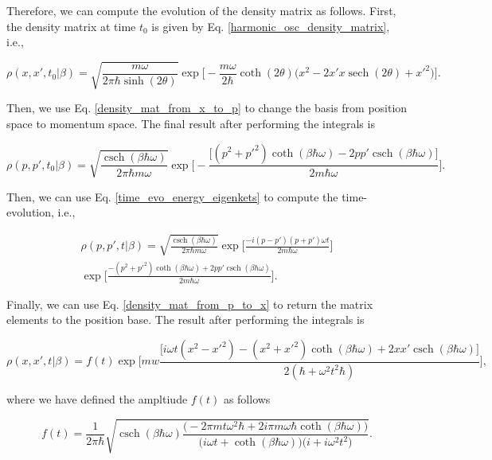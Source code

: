 \documentclass{article}
\DeclareMathOperator{\sech}{sech}
\DeclareMathOperator{\csch}{csch}
\begin{document}
Therefore, we can compute the evolution of the density matrix as follows. First, the density matrix at time $t_{0}$ is given by Eq. \ref{harmonic_osc_density_matrix}, i.e.,

\begin{equation}
    \rho(x, x', t_{0}|\beta) = \sqrt{\frac{m\omega}{2\pi \hbar \sinh(2\theta)}} \exp \Bigg[ - \frac{m\omega}{2\hbar} \coth(2\theta) \big( x^{2} - 2x' x \sech(2\theta) + x'^{2} \big) \Big].
\end{equation}

Then, we use Eq. \ref{density_mat_from_x_to_p} to change the basis from position space to momentum space. The final result after performing the integrals is

\begin{equation}\label{harmonic_osc_density_mat_momentum_base}
    \rho(p, p', t_{0}|\beta) = \sqrt{\frac{\csch(\beta \hbar \omega)}{2\pi \hbar m \omega}} \exp \bigg[ -\frac{\big[ (p^{2}+p'^{2})\coth(\beta \hbar \omega) - 2pp'\csch(\beta \hbar \omega) \big]}{2m\hbar \omega} \bigg].
\end{equation}

Then, we can use Eq. \ref{time_evo_energy_eigenkets} to compute the time-evolution, i.e.,

\begin{multline}
    \rho(p, p', t|\beta) = \sqrt{\frac{\csch(\beta \hbar \omega)}{2\pi \hbar m \omega}} \exp \bigg[ \frac{-i(p-p')(p+p')\omega t}{2m\hbar \omega} \bigg] \\ \exp \bigg[ \frac{ -(p^{2}+p'^{2})\coth(\beta \hbar \omega) + 2pp'\csch(\beta \hbar \omega) }{2m \hbar \omega} \bigg].
\end{multline}

Finally, we can use Eq. \ref{density_mat_from_p_to_x} to return the matrix elements to the position base. The result after performing the integrals is

\begin{equation}
    \rho(x, x', t|\beta) = f(t) \exp \Bigg[ mw \frac{\big[ i\omega t(x^{2}-x'^{2})-(x^{2}+x'^{2})\coth(\beta \hbar \omega) + 2xx' \csch(\beta \hbar \omega) \big]}{2(\hbar + \omega^{2}t^{2}\hbar)} \Bigg],
\end{equation}

where we have defined the ampltiude $f(t)$ as follows

\begin{equation}
    f(t)=\frac{1}{2\pi \hbar} \sqrt{ \csch(\beta \hbar \omega) \frac{\big(-2\pi m t \omega^{2} \hbar + 2i\pi m \omega \hbar \coth(\beta \hbar \omega)\big)}{\big( i\omega t + \coth(\beta \hbar \omega) \big) \big( i + i\omega^{2} t^{2} \big)}}.
\end{equation}
\end{document}

